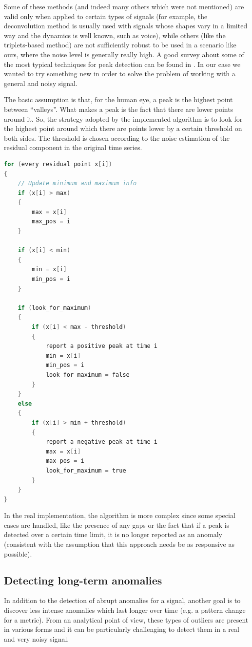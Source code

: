 \documentclass[12pt,a4paper,cucitura]{toptesi}
\begin{document}
Some of these methods (and indeed many others which were not mentioned) are valid only when applied to certain types of signals (for example, the deconvolution method is usually used with signals whose shapes vary in a limited way and the dynamics is well known, such as voice), while others (like the triplets-based method) are not sufficiently robust to be used in a scenario like ours, where the noise level is generally really high. A good survey about some of the most typical techniques for peak detection can be found in \cite{peak}.
In our case we wanted to try something new in order to solve the problem of working with a general and noisy signal.

The basic assumption is that, for the human eye, a peak is the highest point between ``valleys''.
What makes a peak is the fact that there are lower points around it. So, the strategy adopted by the implemented algorithm is to look for the highest point around which there are points lower by a certain threshold on both sides. The threshold is chosen according to the noise estimation of the residual component in the original time series.

\begin{lstlisting}[frame=shadowbox,caption=Algorithm for peak detection,language=C,tabsize=2,basicstyle=\scriptsize]
for (every residual point x[i])
{
	// Update minimum and maximum info
	if (x[i] > max)
	{
		max = x[i]
		max_pos = i
	}
	
	if (x[i] < min)
	{
		min = x[i]
		min_pos = i
	}
	
	if (look_for_maximum)
	{
		if (x[i] < max - threshold)
		{
			report a positive peak at time i
			min = x[i]
			min_pos = i
			look_for_maximum = false
		}
	}
	else
	{
		if (x[i] > min + threshold)
		{
			report a negative peak at time i
			max = x[i]
			max_pos = i
			look_for_maximum = true
		}
	}	
}
\end{lstlisting}

In the real implementation, the algorithm is more complex since some special cases are handled, like the presence of any gaps or the fact that if a peak is detected over a certain time limit, it is no longer reported as an anomaly (consistent with the assumption that this approach needs be as responsive as possible).

\subsection{Detecting long-term anomalies}

In addition to the detection of abrupt anomalies for a signal, another goal is to discover less intense anomalies which last longer over time (e.g. a pattern change for a metric). From an analytical point of view, these types of outliers are present in various forms and it can be particularly challenging to detect them in a real and very noisy signal.
\end{document}
